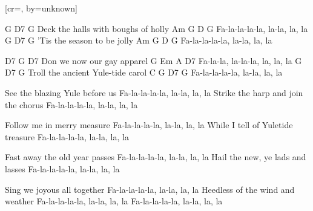 [cr={}, by={unknown}]

\beginverse

G			D7	 G
Deck the halls with boughs of holly
Am 	     G	        D  G
Fa-la-la-la-la, la-la, la, la
G		D7	G
’Tis the season to be jolly
Am           G           D   G
Fa-la-la-la-la, la-la, la, la

D7		    G        D7
Don we now our gay apparel
G           Em       A        D7
Fa-la-la, la-la-la, la, la, la
G		  D7             G
Troll the ancient Yule-tide carol
C	        G        D7  G
Fa-la-la-la-la, la-la, la, la

See the blazing Yule before us
Fa-la-la-la-la, la-la, la, la
Strike the harp and join the chorus
Fa-la-la-la-la, la-la, la, la

Follow me in merry measure
Fa-la-la-la-la, la-la, la, la
While I tell of Yuletide treasure
Fa-la-la-la-la, la-la, la, la

Fast away the old year passes
Fa-la-la-la-la, la-la, la, la
Hail the new, ye lads and lasses
Fa-la-la-la-la, la-la, la, la

Sing we joyous all together
Fa-la-la-la-la, la-la, la, la
Heedless of the wind and weather
Fa-la-la-la-la, la-la, la, la
Fa-la-la-la-la, la-la, la, la

\endverse


\endsong
